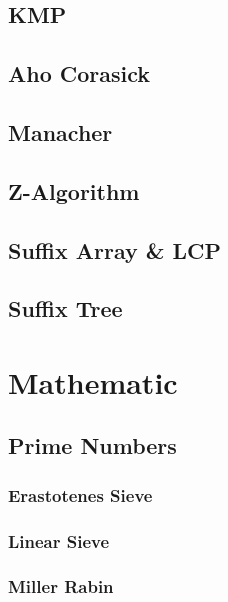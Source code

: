 \documentclass[10pt,a4paper]{report}
\begin{document}
	\section{KMP}
		
	\newpage
	\section{Aho Corasick}
		
	\newpage
	\section{Manacher}
		
	\newpage
	\section{Z-Algorithm}
		
	\newpage
	\section{Suffix Array \& LCP}
		
	\section{Suffix Tree}
	
\chapter{Mathematic}
	\section{Prime Numbers}
		\subsection{Erastotenes Sieve}
		\newpage
		\subsection{Linear Sieve}
			
		\newpage
		\subsection{Miller Rabin}
			
		\newpage
\end{document}
